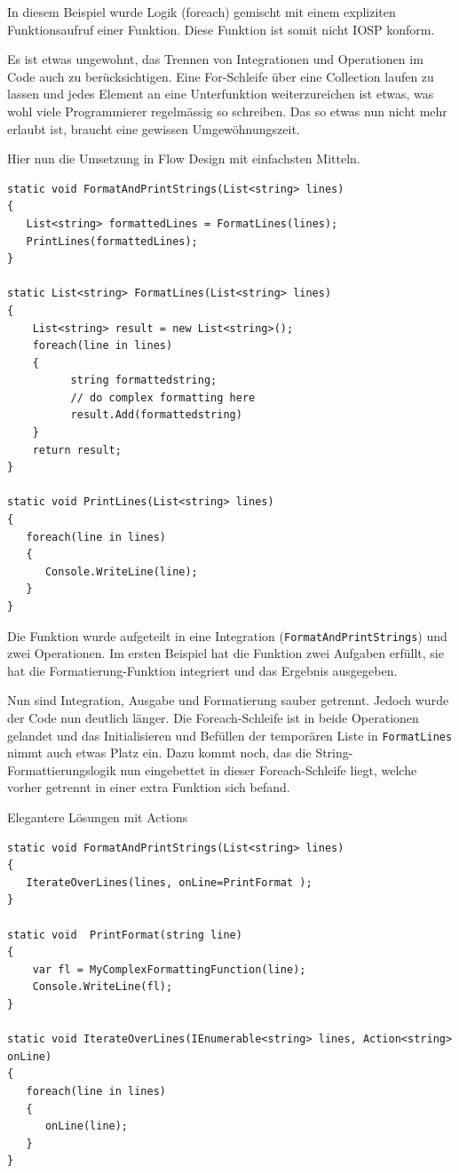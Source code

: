 \documentclass[a4paper,12pt,oneside]{book}
\begin{document}
In diesem Beispiel wurde Logik (foreach) gemischt mit einem expliziten Funktionsaufruf einer Funktion.
Diese Funktion ist somit nicht IOSP konform.

Es ist etwas ungewohnt, das Trennen von Integrationen und Operationen im Code auch zu berücksichtigen.
Eine For-Schleife über eine Collection laufen zu lassen und jedes Element an eine Unterfunktion weiterzureichen ist etwas,
was wohl viele Programmierer regelmässig so schreiben.
Das so etwas nun nicht mehr erlaubt ist, braucht eine gewissen Umgewöhnungszeit.


Hier nun die Umsetzung in Flow Design mit einfachsten Mitteln.



\begin{verbatim}
static void FormatAndPrintStrings(List<string> lines)
{
   List<string> formattedLines = FormatLines(lines);
   PrintLines(formattedLines);
}

static List<string> FormatLines(List<string> lines)
{
    List<string> result = new List<string>();
    foreach(line in lines)
    {
          string formattedstring;
          // do complex formatting here
          result.Add(formattedstring)
    }
    return result;
}

static void PrintLines(List<string> lines)
{
   foreach(line in lines)
   {
      Console.WriteLine(line);
   }
}
\end{verbatim}

Die Funktion wurde aufgeteilt in eine Integration (\texttt{FormatAndPrintStrings}) und zwei Operationen.
Im ersten Beispiel hat die Funktion zwei Aufgaben erfüllt, sie hat die Formatierung-Funktion integriert und
das Ergebnis ausgegeben.

Nun sind Integration, Ausgabe und Formatierung sauber getrennt.
Jedoch wurde der Code nun deutlich länger. Die Foreach-Schleife ist in beide Operationen gelandet und das Initialisieren und
Befüllen der temporären Liste in \texttt{FormatLines} nimmt auch etwas Platz ein.
Dazu kommt noch, das die String-Formattierungslogik nun eingebettet in dieser Foreach-Schleife liegt, welche vorher getrennt in
einer extra Funktion sich befand.

Elegantere Lösungen mit Actions

\begin{verbatim}
static void FormatAndPrintStrings(List<string> lines)
{
   IterateOverLines(lines, onLine=PrintFormat );
}

static void  PrintFormat(string line)
{
    var fl = MyComplexFormattingFunction(line);
    Console.WriteLine(fl);
}

static void IterateOverLines(IEnumerable<string> lines, Action<string> onLine)
{
   foreach(line in lines)
   {
      onLine(line);
   }
}
\end{verbatim}
\end{document}
